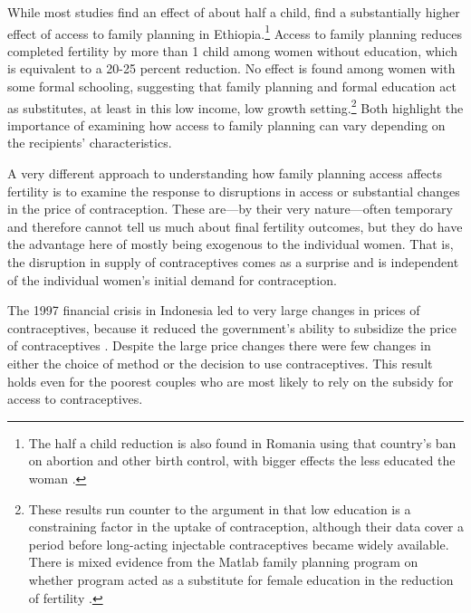 \documentclass[]{article}
\begin{document}
While most studies find an effect of about half a child, \citet{Portner2011} find a substantially higher effect of access to family planning in Ethiopia.\footnote{The half a child reduction is also found in Romania using that country's ban on abortion and other birth control, with bigger effects the less educated the woman \citep{Pop-Eleches2010}.} Access to family planning reduces completed fertility by more than 1 child among women without education, which is equivalent to a 20-25 percent reduction. No effect is found among women with some formal schooling, suggesting that family planning and formal education act as substitutes, at least in this low income, low growth setting.\footnote{These results run counter to the argument in \citet{Feyisetan1996} that low education is a constraining factor in the uptake of contraception, although their data cover a period before long-acting injectable contraceptives became widely available. There is mixed evidence from the Matlab family planning program on whether program acted as a substitute for female education in the reduction of fertility \citep{Sinha2005,Joshi2007}.} Both highlight the importance of examining how access to family planning can vary depending on the recipients' characteristics.

A very different approach to understanding how family planning access affects fertility is to examine the response to disruptions in access or substantial changes in the price of contraception. These are---by their very nature---often temporary and therefore cannot tell us much about final fertility outcomes, but they do have the advantage here of mostly being exogenous to the individual women. That is, the disruption in supply of contraceptives comes as a surprise and is independent of the individual women's initial demand for contraception.

The 1997 financial crisis in Indonesia led to very large changes in prices of contraceptives, because it reduced the government's ability to subsidize the price of contraceptives \citep{McKelvey2012}. Despite the large price changes there were few changes in either the choice of method or the decision to use contraceptives. This result holds even for the poorest couples who are most likely to rely on the subsidy for access to contraceptives.
\end{document}
